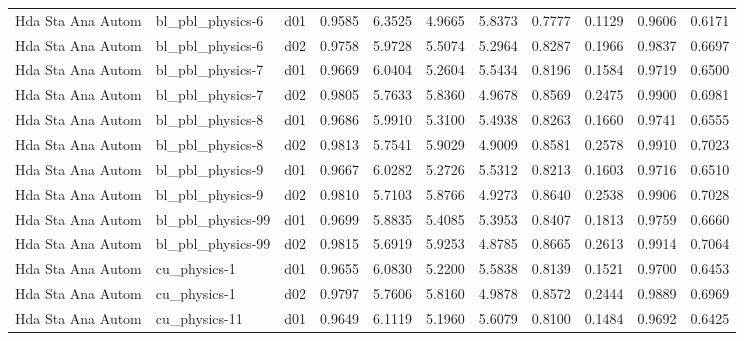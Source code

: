 \begin{longtable}{lllrrrrrrrr}
    Hda Sta Ana Autom  &      bl\_pbl\_physics-6 &     d01 &   0.9585 &   6.3525 &   4.9665 &       5.8373 &        0.7777 &       0.1129 &           0.9606 &  0.6171 \\
    Hda Sta Ana Autom  &      bl\_pbl\_physics-6 &     d02 &   0.9758 &   5.9728 &   5.5074 &       5.2964 &        0.8287 &       0.1966 &           0.9837 &  0.6697 \\
    Hda Sta Ana Autom  &      bl\_pbl\_physics-7 &     d01 &   0.9669 &   6.0404 &   5.2604 &       5.5434 &        0.8196 &       0.1584 &           0.9719 &  0.6500 \\
    Hda Sta Ana Autom  &      bl\_pbl\_physics-7 &     d02 &   0.9805 &   5.7633 &   5.8360 &       4.9678 &        0.8569 &       0.2475 &           0.9900 &  0.6981 \\
    Hda Sta Ana Autom  &      bl\_pbl\_physics-8 &     d01 &   0.9686 &   5.9910 &   5.3100 &       5.4938 &        0.8263 &       0.1660 &           0.9741 &  0.6555 \\
    Hda Sta Ana Autom  &      bl\_pbl\_physics-8 &     d02 &   0.9813 &   5.7541 &   5.9029 &       4.9009 &        0.8581 &       0.2578 &           0.9910 &  0.7023 \\
    Hda Sta Ana Autom  &      bl\_pbl\_physics-9 &     d01 &   0.9667 &   6.0282 &   5.2726 &       5.5312 &        0.8213 &       0.1603 &           0.9716 &  0.6510 \\
    Hda Sta Ana Autom  &      bl\_pbl\_physics-9 &     d02 &   0.9810 &   5.7103 &   5.8766 &       4.9273 &        0.8640 &       0.2538 &           0.9906 &  0.7028 \\
    Hda Sta Ana Autom  &     bl\_pbl\_physics-99 &     d01 &   0.9699 &   5.8835 &   5.4085 &       5.3953 &        0.8407 &       0.1813 &           0.9759 &  0.6660 \\
    Hda Sta Ana Autom  &     bl\_pbl\_physics-99 &     d02 &   0.9815 &   5.6919 &   5.9253 &       4.8785 &        0.8665 &       0.2613 &           0.9914 &  0.7064 \\
    Hda Sta Ana Autom  &          cu\_physics-1 &     d01 &   0.9655 &   6.0830 &   5.2200 &       5.5838 &        0.8139 &       0.1521 &           0.9700 &  0.6453 \\
    Hda Sta Ana Autom  &          cu\_physics-1 &     d02 &   0.9797 &   5.7606 &   5.8160 &       4.9878 &        0.8572 &       0.2444 &           0.9889 &  0.6969 \\
    Hda Sta Ana Autom  &         cu\_physics-11 &     d01 &   0.9649 &   6.1119 &   5.1960 &       5.6079 &        0.8100 &       0.1484 &           0.9692 &  0.6425 \\

\end{longtable}
